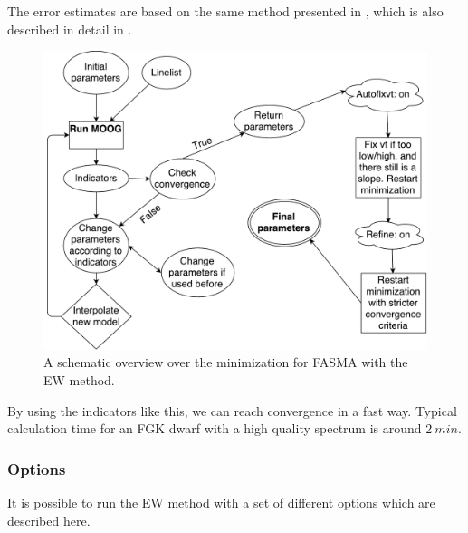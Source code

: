 \documentclass{aa}
\begin{document}
The error estimates are based on the same method presented in
\citet{Gonzalez2000}, which is also described in detail in
\citet{Santos2003,Andreasen2016}.

\begin{figure}[tpb]
    \centering
    \includegraphics[width=1.0\linewidth,natwidth=700,natheight=650]{figures/FASMA_minimization.pdf}
    \caption{A schematic overview over the minimization for FASMA with the
    EW method.}
    \label{fig:FASMA_minimization}
\end{figure}

By using the indicators like this, we can reach convergence in a fast way.
Typical calculation time for an FGK dwarf with a high quality spectrum is around
$\SI{2}{min}$.

\subsubsection{Options}
\label{subs:EWoptions}
It is possible to run the EW method with a set of different options which
are described here.
\end{document}
